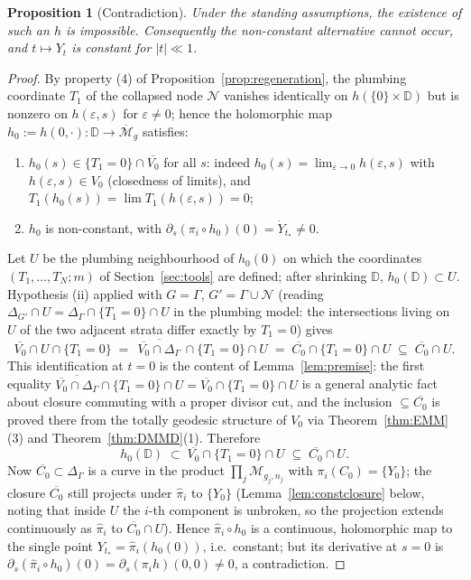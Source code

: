 \documentclass[11pt]{article}
\newcommand{\D}{\mathbb{D}}
\newcommand{\M}{\mathcal{M}}
\newtheorem{prop}[thm]{Proposition}
\theoremstyle{definition}
\theoremstyle{remark}
\begin{document}
\begin{prop}[Contradiction]\label{prop:contradiction}
Under the standing assumptions, the existence of such an $h$ is
impossible. Consequently the non-constant alternative cannot
occur, and $t \mapsto Y_t$ is constant for $|t| \ll 1$.
\end{prop}

\begin{proof}
By property (4) of Proposition~\ref{prop:regeneration}, the plumbing
coordinate $T_1$ of the collapsed node $\mathcal N$ vanishes identically
on $h(\{0\}\times\D)$ but is nonzero on $h(\varepsilon,s)$ for
$\varepsilon \neq 0$; hence the holomorphic map
$h_0 := h(0,\cdot) : \D \to \overline{\M}_g$ satisfies:
\begin{enumerate}[label=(\alph*)]
\item $h_0(s) \in \{T_1 = 0\} \cap \overline{V_0}$ for all $s$: indeed
$h_0(s) = \lim_{\varepsilon \to 0} h(\varepsilon, s)$ with
$h(\varepsilon,s) \in V_0$ (closedness of limits), and $T_1(h_0(s)) =
\lim T_1(h(\varepsilon,s)) = 0$;
\item $h_0$ is non-constant, with
$\partial_s (\pi_i \circ h_0)(0) = \dot Y_{t_*} \neq 0$.
\end{enumerate}
Let $U$ be the plumbing neighbourhood of $h_0(0)$ on which the
coordinates $(T_1,\dots,T_N; m)$ of Section~\ref{sec:tools} are defined;
after shrinking $\D$, $h_0(\D) \subset U$. Hypothesis (ii) applied with
$G = \Gamma$, $G' = \Gamma \cup \mathcal N$ (reading
$\Delta_{G'} \cap U = \Delta_\Gamma \cap \{T_1 = 0\} \cap U$ in the
plumbing model: the intersections living on $U$ of the two adjacent
strata differ exactly by $T_1 = 0$) gives
\[
\overline{V_0} \cap U \cap \{T_1 = 0\}
\;=\;
\overline{\,\overline{V_0} \cap \Delta_\Gamma\,} \cap \{T_1 = 0\} \cap U
\;=\;
\overline{C_0} \cap \{T_1 = 0\} \cap U
\;\subseteq\; \overline{C_0} \cap U.
\]
This identification at $t = 0$ is the content of
Lemma~\ref{lem:premise}: the first equality $\overline{\overline{V_0}
\cap \Delta_\Gamma} \cap \{T_1 = 0\} \cap U = \overline{V_0} \cap
\{T_1 = 0\} \cap U$ is a general analytic fact about closure commuting
with a proper divisor cut, and the inclusion $\subseteq
\overline{C_0}$ is proved there from the totally geodesic structure of
$V_0$ via Theorem~\ref{thm:EMM}(3) and Theorem~\ref{thm:DMMD}(1). Therefore
\[
h_0(\D) \;\subset\; \overline{V_0} \cap \{T_1 = 0\} \cap U
\;\subseteq\; \overline{C_0} \cap U .
\]
Now $\overline{C_0} \subset \Delta_\Gamma$ is a curve in the product
$\prod_j \M_{g_j,n_j}$ with $\pi_i(C_0) = \{Y_0\}$; the closure
$\overline{C_0}$ still projects under $\hat\pi_i$ to $\{Y_0\}$
(Lemma~\ref{lem:constclosure} below, noting that inside $U$ the
$i$-th component is unbroken, so the projection extends continuously as
$\hat\pi_i$ to $\overline{C_0}\cap U$). Hence $\hat\pi_i \circ h_0$
is a continuous, holomorphic map to the single point $Y_{t_*} =
\hat\pi_i(h_0(0))$, i.e.\ constant; but its derivative at $s=0$ is
$\partial_s(\hat\pi_i \circ h_0)(0) = \partial_s(\pi_i h)(0,0) \neq 0$,
a contradiction. \qedhere
\end{proof}
\end{document}
